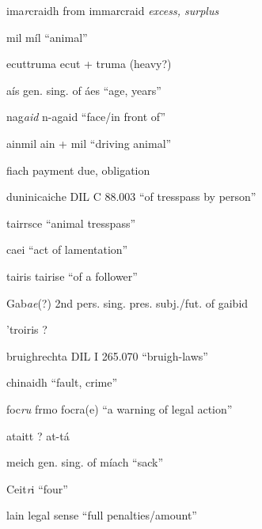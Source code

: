 \documentclass[11pt]{article}
\begin{document}
  \item[ima\emph{r}craidh] from immarcraid \emph{excess, surplus}

  \item[mil] m\'{i}l \enquote{animal}

  \item[ecuttruma] ecut + truma (heavy?)

  \item[a\'{i}s] gen. sing. of \'{a}es \enquote{age, years}

  \item[nag\emph{aid}] n-agaid \enquote{face/in front of}

  \item[ainmil] ain + mil \enquote{driving animal}

  \item[fiach] payment due, obligation

  \item[duninicaiche] DIL C 88.003 \enquote{of tresspass by person}

  \item[tairrsce] \enquote{animal tresspass}

  \item[caei] \enquote{act of lamentation}

  \item[tairis] tairise \enquote{of a follower}

  \item[Gab\emph{ae}(?)] 2nd pers. sing. pres. subj./fut. of gaibid

  \item['troiris] ?

  \item[bruighrechta] DIL I 265.070 \enquote{bruigh-laws}

  \item[chinaidh] \enquote{fault, crime}

  \item[foc\emph{ru}] frmo focra(e) \enquote{a warning of legal action}

  \item[ataitt] ? at-t\'{a}

  \item[meich] gen. sing. of m\'{i}ach \enquote{sack}

  \item[Ceit\emph{r}i] \enquote{four}

  \item[lain] legal sense \enquote{full penalties/amount}
\end{document}
